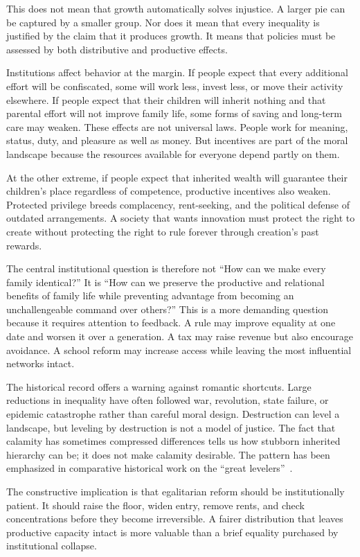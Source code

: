 ﻿\documentclass[12pt,a4paper]{book}
\begin{document}
This does not mean that growth automatically solves injustice.  A larger pie
can be captured by a smaller group.  Nor does it mean that every inequality
is justified by the claim that it produces growth.  It means that policies
must be assessed by both distributive and productive effects.

Institutions affect behavior at the margin.  If people expect that every
additional effort will be confiscated, some will work less, invest less, or
move their activity elsewhere.  If people expect that their children will
inherit nothing and that parental effort will not improve family life, some
forms of saving and long-term care may weaken.  These effects are not
universal laws.  People work for meaning, status, duty, and pleasure as well
as money.  But incentives are part of the moral landscape because the
resources available for everyone depend partly on them.

At the other extreme, if people expect that inherited wealth will guarantee
their children’s place regardless of competence, productive incentives also
weaken.  Protected privilege breeds complacency, rent-seeking, and the
political defense of outdated arrangements.  A society that wants innovation
must protect the right to create without protecting the right to rule
forever through creation's past rewards.

The central institutional question is therefore not ``How can we make every
family identical?''  It is ``How can we preserve the productive and
relational benefits of family life while preventing advantage from becoming
an unchallengeable command over others?''  This is a more demanding
question because it requires attention to feedback.  A rule may improve
equality at one date and worsen it over a generation.  A tax may raise
revenue but also encourage avoidance.  A school reform may increase access
while leaving the most influential networks intact.

The historical record offers a warning against romantic shortcuts.  Large
reductions in inequality have often followed war, revolution, state failure,
or epidemic catastrophe rather than careful moral design.  Destruction can
level a landscape, but leveling by destruction is not a model of justice.
The fact that calamity has sometimes compressed differences tells us how
stubborn inherited hierarchy can be; it does not make calamity desirable.
The pattern has been emphasized in comparative historical work on the
``great levelers''~\cite{Scheidel-2017}.

The constructive implication is that egalitarian reform should be
institutionally patient.  It should raise the floor, widen entry, remove
rents, and check concentrations before they become irreversible.  A fairer
distribution that leaves productive capacity intact is more valuable than a
brief equality purchased by institutional collapse.
\end{document}
